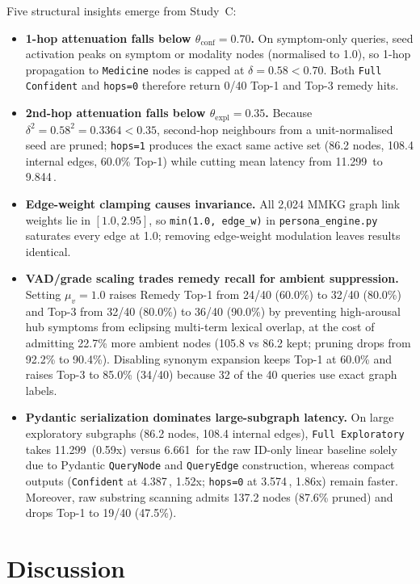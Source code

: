 \documentclass[12pt,a4paper,oneside]{report}
\newcommand{\code}[1]{\texttt{\small #1}}
\newcommand{\ms}{\,\text{ms}}
\begin{document}
\noindent Five structural insights emerge from Study~C:
\begin{itemize}
  \item \textbf{1-hop attenuation falls below $\theta_{\text{conf}} = 0.70$.} On symptom-only queries, seed activation peaks on symptom or modality nodes (normalised to 1.0), so 1-hop propagation to \code{Medicine} nodes is capped at $\delta = 0.58 < 0.70$. Both \code{Full Confident} and \code{hops=0} therefore return 0/40 Top-1 and Top-3 remedy hits.
  \item \textbf{2nd-hop attenuation falls below $\theta_{\text{expl}} = 0.35$.} Because $\delta^2 = 0.58^2 = 0.3364 < 0.35$, second-hop neighbours from a unit-normalised seed are pruned; \code{hops=1} produces the exact same active set (86.2 nodes, 108.4 internal edges, 60.0\% Top-1) while cutting mean latency from 11.299\ms{} to 9.844\ms{}.
  \item \textbf{Edge-weight clamping causes invariance.} All 2,024 MMKG graph link weights lie in $[1.0, 2.95]$, so \code{min(1.0, edge\_w)} in \code{persona\_engine.py} saturates every edge at 1.0; removing edge-weight modulation leaves results identical.
  \item \textbf{VAD/grade scaling trades remedy recall for ambient suppression.} Setting $\mu_v = 1.0$ raises Remedy Top-1 from 24/40 (60.0\%) to 32/40 (80.0\%) and Top-3 from 32/40 (80.0\%) to 36/40 (90.0\%) by preventing high-arousal hub symptoms from eclipsing multi-term lexical overlap, at the cost of admitting 22.7\% more ambient nodes (105.8 vs 86.2 kept; pruning drops from 92.2\% to 90.4\%). Disabling synonym expansion keeps Top-1 at 60.0\% and raises Top-3 to 85.0\% (34/40) because 32 of the 40 queries use exact graph labels.
  \item \textbf{Pydantic serialization dominates large-subgraph latency.} On large exploratory subgraphs (86.2 nodes, 108.4 internal edges), \code{Full Exploratory} takes 11.299\ms{} (0.59x) versus 6.661\ms{} for the raw ID-only linear baseline solely due to Pydantic \code{QueryNode} and \code{QueryEdge} construction, whereas compact outputs (\code{Confident} at 4.387\ms{}, 1.52x; \code{hops=0} at 3.574\ms{}, 1.86x) remain faster. Moreover, raw substring scanning admits 137.2 nodes (87.6\% pruned) and drops Top-1 to 19/40 (47.5\%).
\end{itemize}

\chapter{Discussion}\label{ch:discussion}
\end{document}

